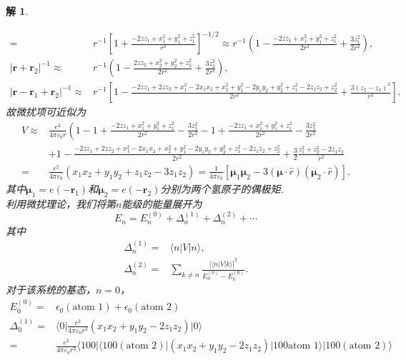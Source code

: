 \documentclass[UTF8,10pt,a4paper]{article}
\theoremstyle{Problem}
\theoremstyle{Solution}
\newtheorem*{sol}{解}
\providecommand{\abs}[1]{\left\lvert#1\right\rvert}
\begin{document}
\begin{sol}
\begin{itemize}
\begin{align}
            =&r^{-1}\left[1+\frac{-2zz_1+x_1^2+y_1^2+z_1^2}{r^2}\right]^{-1/2}\approx r^{-1}\left(1-\frac{-2zz_1+x_1^2+y_1^2+z_1^2}{2r^2}+\frac{3z_1^2}{2r^2}\right),\\
            \abs{\bm{r}+\bm{r}_2}^{-1}\approx&r^{-1}\left(1-\frac{2zz_2+x_2^2+y_2^2+z_2^2}{2r^2}+\frac{3z_2^2}{2r^2}\right),\\
            \abs{\bm{r}-\bm{r}_1+\bm{r}_2}^{-1}\approx&r^{-1}\left[1-\frac{-2zz_1+2zz_2+x_1^2-2x_1x_2+x_2^2+y_1^2-2y_1y_2+y_2^2+z_1^2-2z_1z_2+z_2^2}{2r^2}+\frac{3(z_2-z_1)^2}{r^2}\right].
        \end{align}
        故微扰项可近似为
        \begin{align}
            \nonumber V\approx&\frac{e^2}{4\pi\varepsilon_0r}\left(1-1+\frac{-2zz_1+x_1^2+y_1^2+z_1^2}{2r^2}-\frac{3z_1^2}{2r^2}-1+\frac{-2zz_1+x_1^2+y_1^2+z_1^2}{2r^2}-\frac{3z_1^2}{2r^2}\right.\\
            \nonumber&+1-\frac{-2zz_1+2zz_2+x_1^2-2x_1x_2+x_2^2+y_1^2-2y_1y_2+y_2^2+z_1^2-2z_1z_2+z_2^2}{2r^2}+\frac{3}{2}\frac{z_1^2+z_2^2-2z_1z_2}{r^2}\\
            =&\frac{e^2}{4\pi\varepsilon_0}(x_1x_2+y_1y_2+z_1z_2-3z_1z_2)=\frac{1}{4\pi\varepsilon_0}[\bm{\mu}_1\bm{\mu}_2-3(\bm{\mu}\cdot\hat{r})(\bm{\mu}_2\cdot\hat{r})].
        \end{align}
        其中$\bm{\mu}_1=e(-\bm{r}_1)$和$\bm{\mu}_2=e(-\bm{r}_2)$分别为两个氢原子的偶极矩.\\
        利用微扰理论，我们将第$n$能级的能量展开为
        \begin{equation}
            E_n=E_n^{(0)}+\Delta_n^{(1)}+\Delta_n^{(2)}+\cdots
        \end{equation}
        其中
        \begin{align}
            \Delta_n^{(1)}=&\langle n\rvert V\lvert n\rangle,\\
            \Delta_n^{(2)}=&\sum_{k\neq n}\frac{\abs{\langle n\rvert V\lvert k\rangle}^2}{E_n^{(0)}-E_k^{(0)}}.
        \end{align}
        对于该系统的基态，$n=0$，
        \begin{align}
            E_0^{(0)}=&\epsilon_0(\text{atom 1})+\epsilon_0(\text{atom 2})\\
            \nonumber\Delta_0^{(1)}=&\langle 0\rvert\frac{e^2}{4\pi\varepsilon_0r^3}(x_1x_2+y_1y_2-2z_1z_2)\rvert 0\rangle\\
            \nonumber=&\frac{e^2}{4\pi\varepsilon_0r^3}\langle 100\rvert\langle 100(\text{atom 2})\rvert(x_1x_2+y_1y_2-2z_1z_2)\lvert 100\text{atom 1}\rangle\lvert 100(\text{atom 2})\rangle\\

\end{align}
\end{itemize}
\end{sol}
\end{document}
